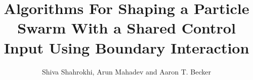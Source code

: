 \documentclass[conference]{IEEEtran}
\begin{document}
\title{Algorithms For Shaping a Particle Swarm With a Shared Control Input Using Boundary Interaction}

\author{Shiva Shahrokhi, Arun Mahadev and Aaron T. Becker}





% 


\maketitle
\end{document}
